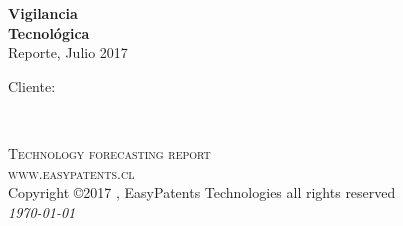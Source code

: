 \documentclass[12pt,openany]{book} %
\begin{document}

\begingroup
\thispagestyle{empty}
\vspace*{5cm}
\begin{flushleft}
\par\normalfont\fontsize{35}{35}\sffamily\selectfont
\textbf{Vigilancia}\\
\textbf{Tecnológica}\\
{\LARGE Reporte, Julio 2017}\par %
\vspace*{1cm}
{\Huge Cliente: \Cliente}\par %
\end{flushleft}
\endgroup


\newpage
~\vfill
\thispagestyle{empty}

\noindent \textsc{Technology forecasting report}\\

\noindent \textsc{www.easypatents.cl}\\ %

\noindent Copyright \copyright 2017 , EasyPatents Technologies all rights reserved \\

\noindent \textit{\today} %



\pagestyle{empty} %

\tableofcontents %


\pagestyle{fancy} %

\end{document}
